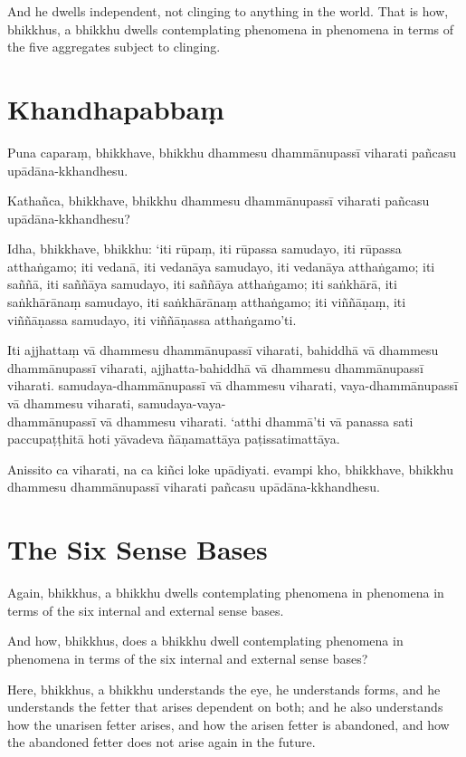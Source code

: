 And he dwells independent, not clinging to anything in the world. That is how,
bhikkhus, a bhikkhu dwells contemplating phenomena in phenomena in terms of the
five aggregates subject to clinging.


\paliPage
\section*{Khandhapabbaṃ}

Puna caparaṃ, bhikkhave, bhikkhu dhammesu dhammānupassī viharati pañcasu
upādāna-kkhandhesu.

Kathañca, bhikkhave, bhikkhu dhammesu dhammānupassī viharati pañcasu
upādāna-kkhandhesu?

Idha, bhikkhave, bhikkhu:
‘iti rūpaṃ, iti rūpassa samudayo, iti rūpassa atthaṅgamo;
iti vedanā, iti vedanāya samudayo, iti vedanāya atthaṅgamo;
iti saññā, iti saññāya samudayo, iti saññāya atthaṅgamo;
iti saṅkhārā, iti saṅkhārānaṃ samudayo, iti saṅkhārānaṃ atthaṅgamo;
iti viññāṇaṃ, iti viññāṇassa samudayo, iti viññāṇassa atthaṅgamo’ti.

Iti ajjhattaṃ vā dhammesu dhammānupassī viharati,
bahiddhā vā dhammesu dhammānupassī viharati,
ajjhatta-bahiddhā vā dhammesu dhammānupassī viharati.
samudaya-dhammānupassī vā dhammesu viharati,
vaya-dhammānupassī vā dhammesu viharati,
samudaya-vaya-\\ dhammānupassī vā dhammesu viharati.
‘atthi dhammā’ti vā panassa sati paccupaṭṭhitā hoti
yāvadeva ñāṇamattāya paṭissatimattāya.

Anissito ca viharati, na ca kiñci loke upādiyati. evampi kho, bhikkhave, bhikkhu
dhammesu dhammānupassī viharati pañcasu upādāna-kkhandhesu.


\englishPage
\section{The Six Sense Bases}

Again, bhikkhus, a bhikkhu dwells contemplating phenomena in phenomena in terms
of the six internal and external sense bases.

And how, bhikkhus, does a bhikkhu dwell contemplating phenomena in phenomena in
terms of the six internal and external sense bases?

Here, bhikkhus, a bhikkhu understands the eye, he understands forms, and he
understands the fetter that arises dependent on both; and he also understands
how the unarisen fetter arises, and how the arisen fetter is abandoned, and how
the abandoned fetter does not arise again in the future.

